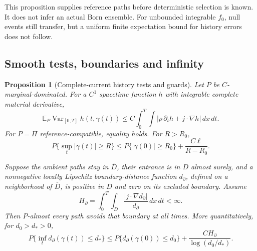 \documentclass[11pt]{article}
\numberwithin{equation}{section}
\newtheorem{proposition}[theorem]{Proposition}
\theoremstyle{definition}
\theoremstyle{remark}
\begin{document}
This proposition supplies reference paths before deterministic selection
is known. It does not infer an actual Born ensemble. For unbounded
integrable $f_0$, null events still transfer, but a uniform finite
expectation bound for history errors does not follow.

\subsection{Smooth tests, boundaries and infinity}

\begin{proposition}[Complete-current history tests and guards]
\label{p3f:prop:guards}
Let $P$ be $C$-marginal-dominated. For a $C^1$ spacetime function $h$ with
integrable complete material derivative,
\begin{equation}\label{p3f:eq:smoothhistory}
 \mathbb E_P\operatorname{Var}_{[0,T]}h(t,\gamma(t))
 \leq C\int_0^T\!\int
           |\rho\,\partial_t h+j\cdot\nabla h|\,dx\,dt.
\end{equation}
For $P=\Pi$ reference-compatible, equality holds. For $R>R_0$,
\begin{equation}\label{p3f:eq:exterior}
 P\{\sup_t|\gamma(t)|\geq R\}
 \leq P\{|\gamma(0)|\geq R_0\}
                         +\frac{C\ell}{R-R_0}.
\end{equation}

Suppose the ambient paths stay in $\overline D$, their entrance is in
$D$ almost surely, and a nonnegative locally Lipschitz boundary-distance
function $d_\partial$, defined on a neighborhood of $\overline D$,
is positive in $D$ and zero on its excluded boundary. Assume
\begin{equation}\label{p3f:eq:boundarycost}
 H_\partial=\int_0^T\!\int_D
              \frac{|j\cdot\nabla d_\partial|}{d_\partial}\,dx\,dt
 <\infty.
\end{equation}
Then $P$-almost every path avoids that boundary at all times. More
quantitatively, for $d_0>d_*>0$,
\begin{equation}\label{p3f:eq:boundaryguard}
 P\{\inf_t d_\partial(\gamma(t))\leq d_*\}
 \leq P\{d_\partial(\gamma(0))\leq d_0\}
                 +\frac{C H_\partial}{\log(d_0/d_*)}.
\end{equation}
\end{proposition}
\end{document}
